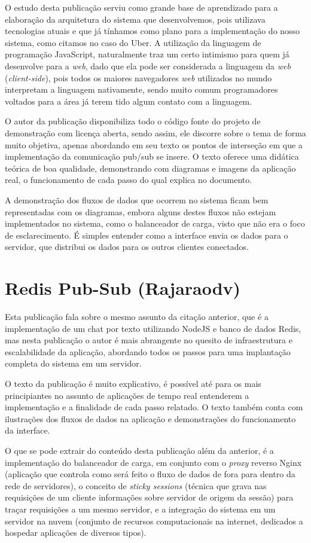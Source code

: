 O estudo desta publicação serviu como grande base de aprendizado para a elaboração da arquitetura do sistema que desenvolvemos, pois utilizava tecnologias atuais e que já tínhamos como plano para a implementação do nosso sistema, como citamos no caso do Uber. A utilização da linguagem de programação JavaScript, naturalmente traz um certo intimismo para quem já desenvolve para a \textit{web}, dado que ela pode ser considerada a linguagem da \textit{web} (\textit{client-side}), pois todos os maiores navegadores \textit{web} \cite{browsers-usage} utilizados no mundo interpretam a linguagem nativamente, sendo muito comum programadores voltados para a área já terem tido algum contato com a linguagem.

O autor da publicação disponibiliza todo o código fonte do projeto de demonstração com licença aberta, sendo assim, ele discorre sobre o tema de forma muito objetiva, apenas abordando em seu texto os pontos de interseção em que a implementação da comunicação pub/sub se insere. O texto oferece uma didática teórica de boa qualidade, demonstrando com diagramas e imagens da aplicação real, o funcionamento de cada passo do qual explica no documento.

A demonstração dos fluxos de dados que ocorrem no sistema ficam bem representadas com os diagramas, embora alguns destes fluxos não estejam implementados no sistema, como o balanceador de carga, visto que não era o foco de esclarecimento. É simples entender como a interface envia os dados para o servidor, que distribui os dados para os outros clientes conectados.

\section{Redis Pub-Sub (Rajaraodv)}
Esta publicação \cite{redis-pubsub-rajaraodv} fala sobre o mesmo assunto da citação anterior, que é a implementação de um chat por texto utilizando NodeJS e banco de dados Redis, mas nesta publicação o autor é mais abrangente no quesito de infraestrutura e escalabilidade da aplicação, abordando todos os passos para uma implantação completa do sistema em um servidor.

O texto da publicação é muito explicativo, é possível até para os mais principiantes no assunto de aplicações de tempo real entenderem a implementação e a finalidade de cada passo relatado. O texto também conta com ilustrações dos fluxos de dados na aplicação e demonstrações do funcionamento da interface.

O que se pode extrair do conteúdo desta publicação além da anterior, é a implementação do balanceador de carga, em conjunto com o \textit{proxy} reverso Nginx (aplicação que controla como será feito o fluxo de dados de fora para dentro da rede de servidores), o conceito de \textit{sticky sessions} (técnica que grava nas requisições de um cliente informações sobre servidor de origem da sessão) para traçar requisições a um mesmo servidor, e a integração do sistema em um servidor na nuvem (conjunto de recursos computacionais na internet, dedicados a hospedar aplicações de diversos tipos). 

